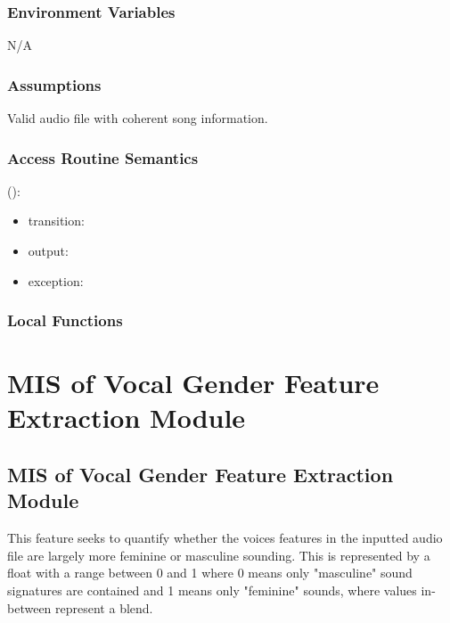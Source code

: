 \documentclass[12pt, titlepage]{article}
\begin{document}
\subsubsection{Environment Variables}
N/A

\subsubsection{Assumptions}
Valid audio file with coherent song information.

\subsubsection{Access Routine Semantics}

\noindent {}():
\begin{itemize}
\item transition:  
\item output:  
\item exception:  
\end{itemize}



\subsubsection{Local Functions}

 

\newpage

\section{MIS of Vocal Gender Feature Extraction Module} 

\subsection{MIS of Vocal Gender Feature Extraction Module}
This feature seeks to quantify whether the voices features in the inputted audio file 
are largely more feminine or masculine sounding. This is represented by a float with a range between
0 and 1 where 0 means only "masculine" sound signatures are contained and 1 means only "feminine" sounds,
where values in-between represent a blend. 
\end{document}
